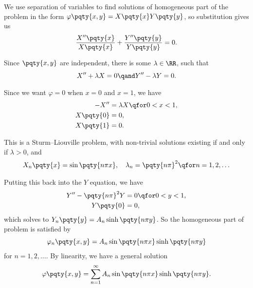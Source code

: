 {We use separation of variables to find solutions of homogeneous part of the problem in the form \(\varphi\pqty{x, y} = X\pqty{x} Y \pqty{y}\), so substitution gives us
\begin{equation}
    \frac{X''\pqty{x}}{X\pqty{x}} + \frac{Y''\pqty{y}}{Y\pqty{y}} = 0.
\end{equation}

Since \(\pqty{x, y}\) are independent, there is some \(\lambda \in \RR\), such that
\begin{equation}
    X'' + \lambda X = 0 \qand Y'' - \lambda Y = 0.
\end{equation}

Since we want \(\varphi = 0\) when \(x = 0\) and \(x = 1\), we have
\begin{subequations}
    \begin{align}
        -X'' &= \lambda X \qfor 0 < x < 1, \\
        X \pqty{0} &= 0, \\
        X \pqty{1} &= 0. \\
    \end{align}
\end{subequations}

This is a Sturm--Liouville problem, with non-trivial solutions existing if and only if \(\lambda > 0\), and
\begin{equation}
    X_n \pqty{x} = \sin \pqty{n \pi x}, \quad \lambda_n = \pqty{n \pi}^2 \qfor n = 1, 2, \ldots
\end{equation}

Putting this back into the \(Y\) equation, we have
\begin{subequations}
    \begin{align}
        Y'' - \pqty{n \pi}^2 Y &= 0 \qfor 0 < y < 1, \\
        Y\pqty{0} &= 0,
    \end{align}
\end{subequations}
which solves to \(Y_n \pqty{y} = A_n \sinh \pqty{n \pi y}\). So the homogeneous part of problem is satisfied by
\begin{equation}
    \varphi_n \pqty{x, y} = A_n \sin \pqty{n \pi x} \sinh \pqty{n \pi y}
\end{equation}
for \(n = 1, 2, \ldots\). By linearity, we have a general solution
\begin{equation}
    \varphi\pqty{x, y} = \sum_{n = 1}^{\infty} A_n \sin\pqty{n \pi x} \sinh\pqty{n \pi y}.
\end{equation}

}
